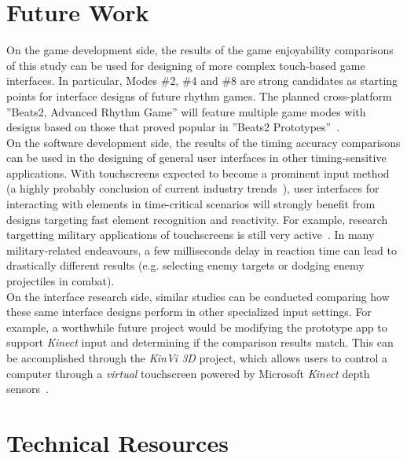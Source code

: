 \documentclass{sig-alternate}
\begin{document}
\section{Future Work}
\label{sec:future_work}

On the game development side, the results of the game enjoyability comparisons of this study can be used for designing of more complex touch-based game interfaces. In particular, Modes \#2, \#4 and \#8 are strong candidates as starting points for interface designs of future rhythm games. The planned cross-platform ''Beats2, Advanced Rhythm Game'' will feature multiple game modes with designs based on those that proved popular in ''Beats2 Prototypes''~\cite{beats_portable}.\\

On the software development side, the results of the timing accuracy comparisons can be used in the designing of general user interfaces in other timing-sensitive applications. With touchscreens expected to become a prominent input method (a highly probably conclusion of current industry trends~\cite{information_display}), user interfaces for interacting with elements in time-critical scenarios will strongly benefit from designs targeting fast element recognition and reactivity. For example, research targetting military applications of touchscreens is still very active~\cite{army_mil}. In many military-related endeavours, a few milliseconds delay in reaction time can lead to drastically different results (e.g. selecting enemy targets or dodging enemy projectiles in combat). \\

On the interface research side, similar studies can be conducted comparing how these same interface designs perform in other specialized input settings. For example, a worthwhile future project would be modifying the prototype app to support \textit{Kinect} input and determining if the comparison results match. This can be accomplished through the \textit{KinVi 3D} project, which allows users to control a computer through a \textit{virtual} touchscreen powered by Microsoft \textit{Kinect} depth sensors~\cite{kinvi3d}. \\

\section{Technical Resources}
\label{sec:resources}

\vspace{4pt}
\end{document}
